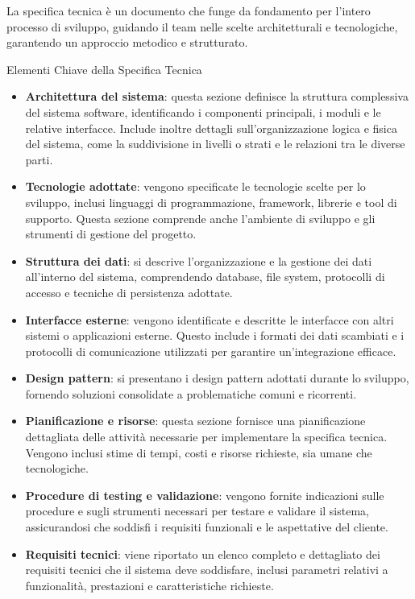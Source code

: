La specifica tecnica è un documento che funge da fondamento per l'intero processo di sviluppo, 
guidando il team nelle scelte architetturali e tecnologiche, garantendo un approccio metodico e strutturato.

{Elementi Chiave della Specifica Tecnica}
\begin{itemize}
    \item \textbf{Architettura del sistema}: questa sezione definisce la struttura complessiva del sistema software, identificando i componenti principali, i moduli e le relative interfacce. Include inoltre dettagli sull'organizzazione logica e fisica del sistema, come la suddivisione in livelli o strati e le relazioni tra le diverse parti.
    \item \textbf{Tecnologie adottate}: vengono specificate le tecnologie scelte per lo sviluppo, inclusi linguaggi di programmazione, framework, librerie e tool di supporto. Questa sezione comprende anche l'ambiente di sviluppo e gli strumenti di gestione del progetto.
    \item \textbf{Struttura dei dati}: si descrive l'organizzazione e la gestione dei dati all'interno del sistema, comprendendo database, file system, protocolli di accesso e tecniche di persistenza adottate.
    \item \textbf{Interfacce esterne}: vengono identificate e descritte le interfacce con altri sistemi o applicazioni esterne. Questo include i formati dei dati scambiati e i protocolli di comunicazione utilizzati per garantire un'integrazione efficace.
    \item \textbf{Design pattern}: si presentano i design pattern adottati durante lo sviluppo, fornendo soluzioni consolidate a problematiche comuni e ricorrenti.
    \item \textbf{Pianificazione e risorse}: questa sezione fornisce una pianificazione dettagliata delle attività necessarie per implementare la specifica tecnica. Vengono inclusi stime di tempi, costi e risorse richieste, sia umane che tecnologiche.
    \item \textbf{Procedure di testing e validazione}: vengono fornite indicazioni sulle procedure e sugli strumenti necessari per testare e validare il sistema, assicurandosi che soddisfi i requisiti funzionali e le aspettative del cliente.
    \item \textbf{Requisiti tecnici}: viene riportato un elenco completo e dettagliato dei requisiti tecnici che il sistema deve soddisfare, inclusi parametri relativi a funzionalità, prestazioni e caratteristiche richieste.
\end{itemize}




